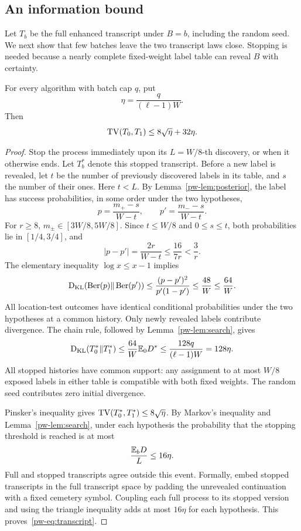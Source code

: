 \subsection{An information bound}\label{pw-sec:information}

Let $T_b$ be the full enhanced transcript under $B=b$, including the random seed. We next show that few batches leave the two transcript laws close. Stopping is needed because a nearly complete fixed-weight label table can reveal $B$ with certainty.

\begin{lemma}\label{pw-lem:information}
For every algorithm with batch cap $q$, put
\[
\eta=\frac{q}{(\ell-1)W}.
\]
Then
\begin{equation}\label{pw-eq:transcript}
\operatorname{TV}(T_0,T_1)\le8\sqrt{\eta}+32\eta.
\end{equation}
\end{lemma}
\begin{proof}
Stop the process immediately upon its $L=W/8$-th discovery, or when it otherwise ends. Let $T_b^*$ denote this stopped transcript. Before a new label is revealed, let $t$ be the number of previously discovered labels in its table, and $s$ the number of their ones. Here $t<L$. By Lemma~\ref{pw-lem:posterior}, the label has success probabilities, in some order under the two hypotheses,
\[
p=\frac{m_+-s}{W-t},\qquad p'=\frac{m_--s}{W-t}.
\]
For $r\ge8$, $m_\pm\in[3W/8,5W/8]$. Since $t\le W/8$ and $0\le s\le t$, both probabilities lie in $[1/4,3/4]$, and
\begin{equation}\label{pw-eq:prob-diff}
|p-p'|=\frac{2r}{W-t}\le\frac{16}{7r}<\frac3r.
\end{equation}
The elementary inequality $\log x\le x-1$ implies
\[
\operatorname{D_{\mathrm{KL}}}(\operatorname{Ber}(p)\Vert\operatorname{Ber}(p'))
\le\frac{(p-p')^2}{p'(1-p')}
\le\frac{48}{W}\le\frac{64}{W}.
\]
All location-test outcomes have identical conditional probabilities under the two hypotheses at a common history. Only newly revealed labels contribute divergence. The chain rule, followed by Lemma~\ref{pw-lem:search}, gives
\begin{equation}\label{pw-eq:kl-stopped}
\operatorname{D_{\mathrm{KL}}}(T_0^*\Vert T_1^*)
\le\frac{64}{W}\mathbb E_0D^*
\le\frac{128q}{(\ell-1)W}=128\eta.
\end{equation}
All stopped histories have common support: any assignment to at most $W/8$ exposed labels in either table is compatible with both fixed weights. The random seed contributes zero initial divergence.

Pinsker's inequality gives $\operatorname{TV}(T_0^*,T_1^*)\le8\sqrt\eta$. By Markov's inequality and Lemma~\ref{pw-lem:search}, under each hypothesis the probability that the stopping threshold is reached is at most
\[
\frac{\mathbb E_bD}{L}\le16\eta.
\]
Full and stopped transcripts agree outside this event. Formally, embed stopped transcripts in the full transcript space by padding the unrevealed continuation with a fixed cemetery symbol. Coupling each full process to its stopped version and using the triangle inequality adds at most $16\eta$ for each hypothesis. This proves~\eqref{pw-eq:transcript}.
\end{proof}

